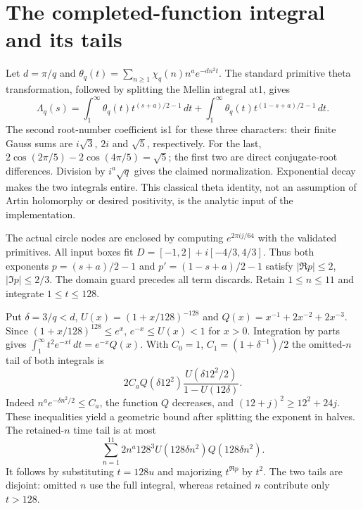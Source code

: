 \documentclass[11pt,oneside,openany]{book}
\theoremstyle{definition}\newtheorem{definition}[theorem]{Definition}
\theoremstyle{remark}\newtheorem{remark}[theorem]{Remark}
\begin{document}
\section{The completed-function integral and its tails}
Let $d=\pi/q$ and $\theta_q(t)=\sum_{n\ge1}\chi_q(n)n^ae^{-dn^2t}$.
The standard primitive theta transformation, followed by splitting the Mellin
integral at1, gives
\[
 \Lambda_q(s)=\int_1^\infty\theta_q(t)t^{(s+a)/2-1}\,dt+
              \int_1^\infty\theta_q(t)t^{(1-s+a)/2-1}\,dt.
\]
The second root-number coefficient is1 for these three characters: their
finite Gauss sums are $i\sqrt3$, $2i$ and $\sqrt5$, respectively.
For the last, $2\cos(2\pi/5)-2\cos(4\pi/5)=\sqrt5$; the first two are direct
conjugate-root differences. Division by $i^a\sqrt q$ gives the claimed
normalization. Exponential decay makes the two integrals entire. This classical
theta identity, not an assumption of Artin holomorphy or desired positivity,
is the analytic input of the implementation.

The actual circle nodes are enclosed by computing $e^{2\pi i j/64}$ with
the validated primitives. All input boxes fit
$D=[-1,2]+i[-4/3,4/3]$. Thus both exponents
$p=(s+a)/2-1$ and $p'=(1-s+a)/2-1$ satisfy
$|\Re p|\le2$, $|\Im p|\le2/3$. The domain guard precedes all term discards.
Retain $1\le n\le11$ and integrate $1\le t\le128$.

Put $\delta=3/q<d$, $U(x)=(1+x/128)^{-128}$ and
$Q(x)=x^{-1}+2x^{-2}+2x^{-3}$. Since $(1+x/128)^{128}\le e^x$,
$e^{-x}\le U(x)<1$ for $x>0$. Integration by parts gives
$\int_1^\infty t^2e^{-xt}\,dt=e^{-x}Q(x)$.
With $C_0=1$, $C_1=(1+\delta^{-1})/2$ the omitted-$n$ tail of both integrals is
\[
 2C_aQ(\delta12^2)
 \frac{U(\delta12^2/2)}{1-U(12\delta)}.
\]
Indeed $n^ae^{-\delta n^2/2}\le C_a$, the function $Q$ decreases, and
$(12+j)^2\ge12^2+24j$. These inequalities yield a geometric bound after
splitting the exponent in halves. The retained-$n$ time tail is at most
\[
 \sum_{n=1}^{11}2n^a128^3U(128\delta n^2)Q(128\delta n^2).
\]
It follows by substituting $t=128u$ and majorizing $t^{\Re p}$ by $t^2$.
The two tails are disjoint: omitted $n$ use the full integral, whereas
retained $n$ contribute only $t>128$.
\end{document}
